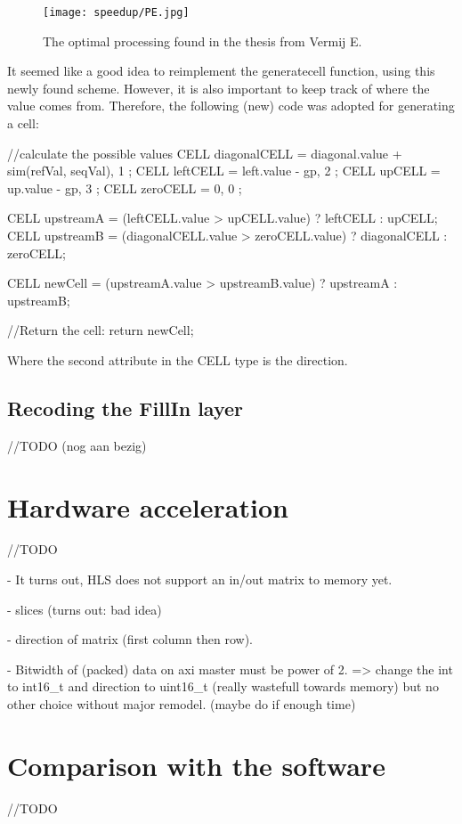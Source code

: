 \begin{figure}[H]
	\centering
	\texttt{[image: speedup/PE.jpg]}
	\caption{The optimal processing found in the thesis from Vermij E.\cite{Vermij}}
	\label{fig:PE}
\end{figure}

It seemed like a good idea to reimplement the generatecell function, using this newly found scheme. However, it is also important to keep track of where the value comes from. Therefore, the following (new) code was adopted for generating a cell:

\begin{lcverbatim}
//calculate the possible  values
CELL diagonalCELL = { diagonal.value + sim(refVal, seqVal), 1 };
CELL leftCELL = { left.value - gp, 2 };
CELL upCELL = { up.value - gp, 3 };
CELL zeroCELL = { 0, 0 };

CELL upstreamA = (leftCELL.value > upCELL.value) ? leftCELL : upCELL;
CELL upstreamB = (diagonalCELL.value > zeroCELL.value) ? 
diagonalCELL : zeroCELL;

CELL newCell = (upstreamA.value > upstreamB.value) ? upstreamA : upstreamB;

//Return the cell:
return newCell;
\end{lcverbatim}

Where the second attribute in the CELL type is the direction.

\subsection{Recoding the FillIn layer}

//TODO (nog aan bezig)

\section{Hardware acceleration}

//TODO

- It turns out, HLS does not support an in/out matrix to memory yet.

- slices (turns out: bad idea)

- direction of matrix (first column then row).

- Bitwidth of (packed) data on axi master must be power of 2. => change the int to int16\_t and direction to uint16\_t (really wastefull towards memory) but no other choice without major remodel. (maybe do if enough time)

\section{Comparison with the software}

//TODO